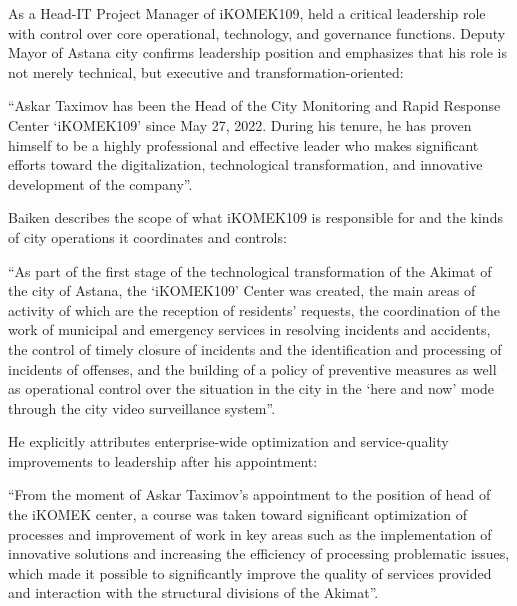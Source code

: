 As a Head-IT Project Manager of iKOMEK109, \mrl{} held a critical leadership role with control over core operational, technology, and governance functions.
Deputy Mayor of Astana city confirms \mrls leadership position and emphasizes that his role is not merely technical, but executive and transformation-oriented:
\begin{fullquote}
``Askar Taximov has been the Head of the City Monitoring and Rapid Response Center `iKOMEK109' since May 27, 2022. During his tenure, he has proven himself to be a highly professional and effective leader who makes significant efforts toward the digitalization, technological transformation, and innovative development of the company''.
\end{fullquote}

Baiken describes the scope of what iKOMEK109 is responsible for and the kinds of city operations it coordinates and controls:
\begin{fullquote}
``As part of the first stage of the technological transformation of the Akimat of the city of Astana, the `iKOMEK109' Center was created, the main areas of activity of which are the reception of residents’ requests, the coordination of the work of municipal and emergency services in resolving incidents and accidents, the control of timely closure of incidents and the identification and processing of incidents of offenses, and the building of a policy of preventive measures as well as operational control over the situation in the city in the `here and now' mode through the city video surveillance system''.
\end{fullquote}

He explicitly attributes enterprise-wide optimization and service-quality improvements to \mrls leadership after his appointment:
\begin{fullquote}
``From the moment of Askar Taximov’s appointment to the position of head of the iKOMEK center, a course was taken toward significant optimization of processes and improvement of work in key areas such as the implementation of innovative solutions and increasing the efficiency of processing problematic issues, which made it possible to significantly improve the quality of services provided and interaction with the structural divisions of the Akimat''.
\end{fullquote}

